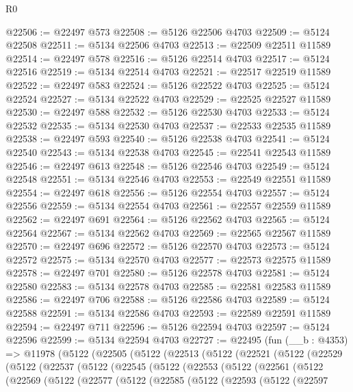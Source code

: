 \begin{lexlean}{R0}
\begin{coremodule}
@22506 := @22497 @573
@22508 := @5126 @22506 @4703
@22509 := @5124 @22508
@22511 := @5134 @22506 @4703
@22513 := @22509 @22511 @11589
@22514 := @22497 @578
@22516 := @5126 @22514 @4703
@22517 := @5124 @22516
@22519 := @5134 @22514 @4703
@22521 := @22517 @22519 @11589
@22522 := @22497 @583
@22524 := @5126 @22522 @4703
@22525 := @5124 @22524
@22527 := @5134 @22522 @4703
@22529 := @22525 @22527 @11589
@22530 := @22497 @588
@22532 := @5126 @22530 @4703
@22533 := @5124 @22532
@22535 := @5134 @22530 @4703
@22537 := @22533 @22535 @11589
@22538 := @22497 @593
@22540 := @5126 @22538 @4703
@22541 := @5124 @22540
@22543 := @5134 @22538 @4703
@22545 := @22541 @22543 @11589
@22546 := @22497 @613
@22548 := @5126 @22546 @4703
@22549 := @5124 @22548
@22551 := @5134 @22546 @4703
@22553 := @22549 @22551 @11589
@22554 := @22497 @618
@22556 := @5126 @22554 @4703
@22557 := @5124 @22556
@22559 := @5134 @22554 @4703
@22561 := @22557 @22559 @11589
@22562 := @22497 @691
@22564 := @5126 @22562 @4703
@22565 := @5124 @22564
@22567 := @5134 @22562 @4703
@22569 := @22565 @22567 @11589
@22570 := @22497 @696
@22572 := @5126 @22570 @4703
@22573 := @5124 @22572
@22575 := @5134 @22570 @4703
@22577 := @22573 @22575 @11589
@22578 := @22497 @701
@22580 := @5126 @22578 @4703
@22581 := @5124 @22580
@22583 := @5134 @22578 @4703
@22585 := @22581 @22583 @11589
@22586 := @22497 @706
@22588 := @5126 @22586 @4703
@22589 := @5124 @22588
@22591 := @5134 @22586 @4703
@22593 := @22589 @22591 @11589
@22594 := @22497 @711
@22596 := @5126 @22594 @4703
@22597 := @5124 @22596
@22599 := @5134 @22594 @4703
@22727 := @22495
    (fun (__b : @4353) =>
    @11978
      (@5122
        (@22505
          (@5122
            (@22513
              (@5122
                (@22521
                  (@5122
                    (@22529
                      (@5122
                        (@22537
                          (@5122
                            (@22545
                              (@5122
                                (@22553
                                  (@5122
                                    (@22561
                                      (@5122
                                        (@22569
                                          (@5122
                                            (@22577
                                              (@5122
                                                (@22585
                                                  (@5122
                                                    (@22593
                                                      (@5122
                                                        (@22597

\end{coremodule}
\end{lexlean}
